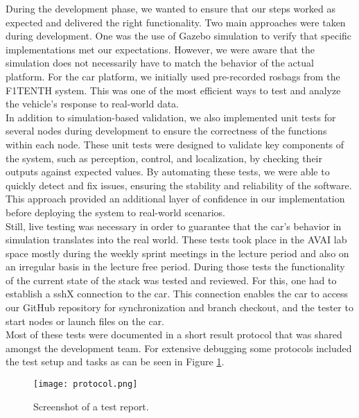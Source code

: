 During the development phase, we wanted to ensure that our steps worked as expected and delivered the right functionality. Two main approaches were taken during development. One was the use of Gazebo simulation to verify that specific implementations met our expectations. However, we were aware that the simulation does not necessarily have to match the behavior of the actual platform. For the car platform, we initially used pre-recorded rosbags from the F1TENTH system. This was one of the most efficient ways to test and analyze the vehicle’s response to real-world data.\\
\newline
In addition to simulation-based validation, we also implemented unit tests for several nodes during development to ensure the correctness of the functions within each node. These unit tests were designed to validate key components of the system, such as perception, control, and localization, by checking their outputs against expected values. By automating these tests, we were able to quickly detect and fix issues, ensuring the stability and reliability of the software. This approach provided an additional layer of confidence in our implementation before deploying the system to real-world scenarios.\\
\newline
Still, live testing was necessary in order to guarantee that the car's behavior in simulation translates into the real world. These tests took place in the AVAI lab space mostly during the weekly sprint meetings in the lecture period and also on an irregular basis in the lecture free period. During those tests the functionality of the current state of the stack was tested and reviewed. For this, one had to establish a sshX connection to the car. This connection enables the car to access our GitHub repository for synchronization and branch checkout, and the tester to start nodes or launch files on the car. \\
\newline
Most of these tests were documented in a short result protocol that was shared amongst the development team. For extensive debugging some protocols included the test setup and tasks as can be seen in Figure \ref{fig:protocol}.

\begin{figure}[htp]
	\vskip 0.2in
	\begin{center}
		\centerline{\texttt{[image: protocol.png]}}
		\caption{Screenshot of a test report.}
		\label{fig:protocol}
	\end{center}
	\vskip -0.2in
\end{figure}
